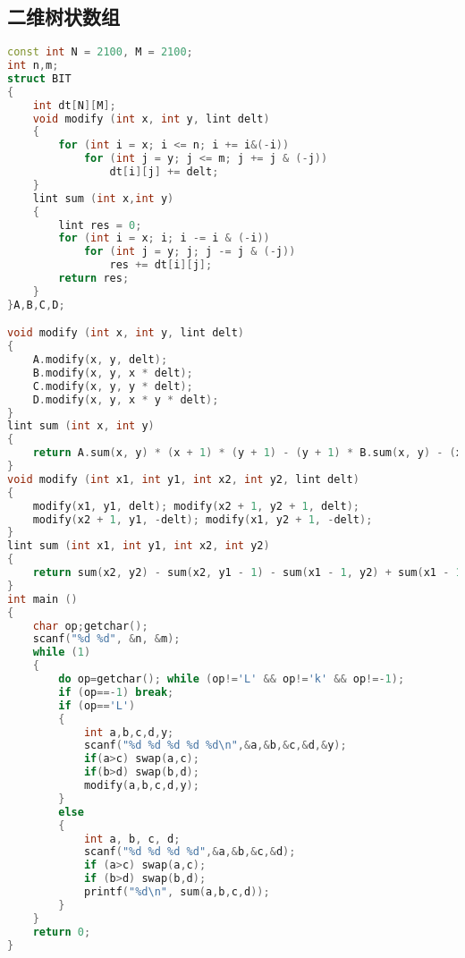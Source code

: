 \subsection{二维树状数组}
    \begin{lstlisting}[language=c++]
const int N = 2100, M = 2100;
int n,m;
struct BIT 
{
    int dt[N][M];
    void modify (int x, int y, lint delt) 
	{
        for (int i = x; i <= n; i += i&(-i))
            for (int j = y; j <= m; j += j & (-j))
                dt[i][j] += delt;
    }
    lint sum (int x,int y) 
	{
        lint res = 0;
        for (int i = x; i; i -= i & (-i))
            for (int j = y; j; j -= j & (-j))
                res += dt[i][j];
        return res;
    }
}A,B,C,D;

void modify (int x, int y, lint delt)
{
    A.modify(x, y, delt);
    B.modify(x, y, x * delt);
    C.modify(x, y, y * delt);
    D.modify(x, y, x * y * delt);
}
lint sum (int x, int y) 
{
    return A.sum(x, y) * (x + 1) * (y + 1) - (y + 1) * B.sum(x, y) - (x + 1) * C.sum(x, y)+D.sum(x, y);
}
void modify (int x1, int y1, int x2, int y2, lint delt) 
{
    modify(x1, y1, delt); modify(x2 + 1, y2 + 1, delt);
    modify(x2 + 1, y1, -delt); modify(x1, y2 + 1, -delt);
}
lint sum (int x1, int y1, int x2, int y2) 
{
    return sum(x2, y2) - sum(x2, y1 - 1) - sum(x1 - 1, y2) + sum(x1 - 1, y1 - 1);
}
int main ()
{
    char op;getchar();
    scanf("%d %d", &n, &m);
    while (1)
    {
        do op=getchar(); while (op!='L' && op!='k' && op!=-1);
        if (op==-1) break;
        if (op=='L')
        {
            int a,b,c,d,y;
            scanf("%d %d %d %d %d\n",&a,&b,&c,&d,&y);
            if(a>c) swap(a,c);
            if(b>d) swap(b,d);
            modify(a,b,c,d,y);
        }
        else
        {
            int a, b, c, d;
            scanf("%d %d %d %d",&a,&b,&c,&d);
            if (a>c) swap(a,c);
            if (b>d) swap(b,d);
            printf("%d\n", sum(a,b,c,d));
        }
    }
    return 0;
}
    \end{lstlisting}

